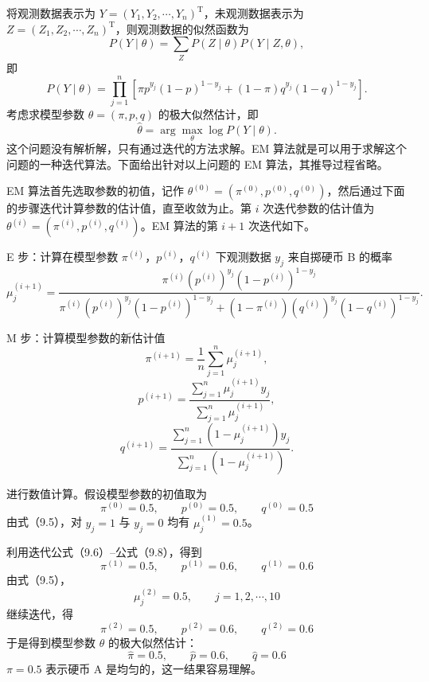 \documentclass[UTF8,12pt,a4paper,fontset=fandol]{ctexart}
\begin{document}
将观测数据表示为 $Y=(Y_1,Y_2,\cdots,Y_n)^{\mathrm T}$，未观测数据表示为 $Z=(Z_1,Z_2,\cdots,Z_n)^{\mathrm T}$，则观测数据的似然函数为
\begin{equation}
  P(Y\mid\theta)=\sum_Z P(Z\mid\theta)P(Y\mid Z,\theta),
  \tag{9.2}
\end{equation}
即
\begin{equation}
  P(Y\mid\theta)=\prod_{j=1}^n
  \left[\pi p^{y_j}(1-p)^{1-y_j}+(1-\pi)q^{y_j}(1-q)^{1-y_j}\right].
  \tag{9.3}
\end{equation}
考虑求模型参数 $\theta=(\pi,p,q)$ 的极大似然估计，即
\begin{equation}
  \hat{\theta}=\arg\max_{\theta}\log P(Y\mid\theta).
  \tag{9.4}
\end{equation}
这个问题没有解析解，只有通过迭代的方法求解。EM 算法就是可以用于求解这个问题的一种迭代算法。下面给出针对以上问题的 EM 算法，其推导过程省略。

EM 算法首先选取参数的初值，记作 $\theta^{(0)}=(\pi^{(0)},p^{(0)},q^{(0)})$，然后通过下面的步骤迭代计算参数的估计值，直至收敛为止。第 $i$ 次迭代参数的估计值为 $\theta^{(i)}=(\pi^{(i)},p^{(i)},q^{(i)})$。EM 算法的第 $i+1$ 次迭代如下。

E 步：计算在模型参数 $\pi^{(i)}$，$p^{(i)}$，$q^{(i)}$ 下观测数据 $y_j$ 来自掷硬币 B 的概率
\begin{equation}
  \mu_j^{(i+1)}
  =\frac{\pi^{(i)}(p^{(i)})^{y_j}(1-p^{(i)})^{1-y_j}}
  {\pi^{(i)}(p^{(i)})^{y_j}(1-p^{(i)})^{1-y_j}+
  (1-\pi^{(i)})(q^{(i)})^{y_j}(1-q^{(i)})^{1-y_j}}.
  \tag{9.5}
\end{equation}

M 步：计算模型参数的新估计值
\begin{equation}
  \pi^{(i+1)}=\frac1n\sum_{j=1}^n \mu_j^{(i+1)},
  \tag{9.6}
\end{equation}
\begin{equation}
  p^{(i+1)}
  =\frac{\sum_{j=1}^n \mu_j^{(i+1)}y_j}
  {\sum_{j=1}^n \mu_j^{(i+1)}},
  \tag{9.7}
\end{equation}
\begin{equation}
  q^{(i+1)}
  =\frac{\sum_{j=1}^n (1-\mu_j^{(i+1)})y_j}
  {\sum_{j=1}^n (1-\mu_j^{(i+1)})}.
  \tag{9.8}
\end{equation}

进行数值计算。假设模型参数的初值取为
\[
  \pi^{(0)}=0.5,\qquad p^{(0)}=0.5,\qquad q^{(0)}=0.5
\]
由式（9.5），对 $y_j=1$ 与 $y_j=0$ 均有 $\mu_j^{(1)}=0.5$。

利用迭代公式（9.6）--公式（9.8），得到
\[
  \pi^{(1)}=0.5,\qquad p^{(1)}=0.6,\qquad q^{(1)}=0.6
\]
由式（9.5），
\[
  \mu_j^{(2)}=0.5,\qquad j=1,2,\cdots,10
\]
继续迭代，得
\[
  \pi^{(2)}=0.5,\qquad p^{(2)}=0.6,\qquad q^{(2)}=0.6
\]
于是得到模型参数 $\theta$ 的极大似然估计：
\[
  \hat{\pi}=0.5,\qquad \hat{p}=0.6,\qquad \hat{q}=0.6
\]
$\pi=0.5$ 表示硬币 A 是均匀的，这一结果容易理解。
\end{document}
